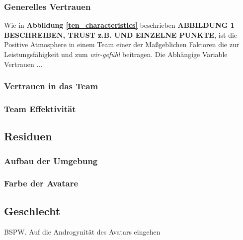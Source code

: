\documentclass[a4paper,11pt]{article}%
\renewcommand{\\}{\vspace*{0.5\baselineskip} \newline}
\begin{document}
			\subsubsection{Generelles Vertrauen}
			Wie in \textbf{Abbildung \ref{ten_characteristics}} beschrieben \textbf{ABBILDUNG 1 BESCHREIBEN, TRUST z.B. UND EINZELNE PUNKTE}, ist die Positive Atmosphere in einem Team einer der Maßgeblichen Faktoren die zur Leistungsfähigkeit und zum \textit{\glqq wir-gefühl\grqq} beitragen.
			Die Abhängige Variable Vertrauen ...	
			\subsubsection{Vertrauen in das Team}
			\subsubsection{Team Effektivität}
			
\subsection{Residuen}
			\subsubsection{Aufbau der Umgebung}
			\subsubsection{Farbe der Avatare}
			\subsection{Geschlecht}
			BSPW. Auf die Androgynität des Avatars eingehen
\end{document}
